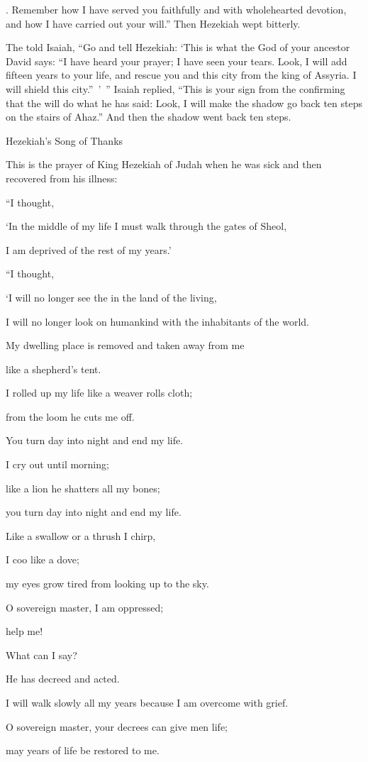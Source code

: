 {{}. Remember
how I have served you faithfully
and with wholehearted
devotion,
and how I have carried
out your will.” Then Hezekiah
wept bitterly.
\par }{\PP {}The
{}
told
Isaiah,
“Go
and tell
Hezekiah: ‘This is what
the
{}
God
of your ancestor
David
says: “I have heard
your prayer;
I have seen
your tears.
Look,
I will add
fifteen
years
to your life,
and rescue
you and this
city
from the king
of Assyria.
I will shield
this
city.” ’ ”
Isaiah replied, “This
is your sign
from the
{}
confirming that
the {}
will do
what
he has
said:
Look,
I will make
the shadow
go
back
ten
steps
on the stairs
of Ahaz.”
And then
the shadow went back
ten
steps.
\par }{\SH Hezekiah’s Song of Thanks
\par }{\PP {}This is the prayer
of King
Hezekiah
of Judah
when he was sick
and then recovered
from his illness:
\par }{\Q {}“I
thought,
\par }{\Q ‘In the middle
of my life
I must walk
through the gates
of Sheol,
\par }{\Q I am deprived
of the rest
of my years.’
\par }{\Q {}“I thought,
\par }{\Q ‘I will no
longer see
the
{}
in the land
of the living,
\par }{\Q I will no
longer
look
on humankind
with
the inhabitants
of the world.
\par }{\Q {}My dwelling place
is removed
and taken away
from
me
\par }{\Q like a shepherd’s
tent.
\par }{\Q I rolled up
my life
like a weaver
rolls cloth;

\par }{\Q from the loom
he cuts me off.
\par }{\Q You turn day
into night
and end my life.
\par }{\Q {}I cry
out until
morning;
\par }{\Q like a lion
he shatters
all
my bones;
\par }{\Q you turn day
into night
and end my life.
\par }{\Q {}Like
a swallow
or a thrush
I chirp,
\par }{\Q I coo
like a dove;
\par }{\Q my eyes
grow tired
from looking up to the sky.
\par }{\Q O sovereign master,
I am oppressed;
\par }{\Q help me!
\par }{\Q {}What
can I say?
\par }{\Q He has
decreed
and acted.
\par }{\Q I will walk slowly
all
my years
because I am overcome
with grief.
\par }{\Q {}O sovereign
master, your decrees can give men life;
\par }{\Q may years of life
be restored
to me.

}
